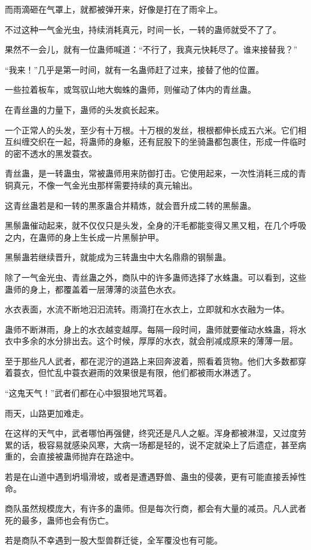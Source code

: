 \begin{this_body}
而雨滴砸在气罩上，就都被弹开来，好像是打在了雨伞上。

不过这种一气金光虫，持续消耗真元，时间一长，一转的蛊师就受不了了。

果然不一会儿，就有一位蛊师喊道：“不行了，我真元快耗尽了。谁来接替我？”

“我来！”几乎是第一时间，就有一名蛊师赶了过来，接替了他的位置。

一些拉着板车，或驾驭山地大蜘蛛的蛊师，则催动了体内的青丝蛊。

在青丝蛊的力量下，蛊师的头发疯长起来。

一个正常人的头发，至少有十万根。十万根的发丝，根根都伸长成五六米。它们相互纠缠交织在一起，将蛊师的身躯，还有屁股下的坐骑蛊都包裹住，形成一件临时的密不透水的黑发蓑衣。

青丝蛊，是一转蛊虫，常被蛊师用来防御打击。它使用起来，一次性消耗三成的青铜真元，不像一气金光虫那样需要持续的真元输出。

这青丝蛊若是和一转的黒豕蛊合并精炼，就会晋升成二转的黑鬃蛊。

黑鬃蛊催动起来，就不仅仅只是头发，全身的汗毛都能变得又黑又粗，在几个呼吸之内，在蛊师的身上生长成一片黑鬃护甲。

黑鬃蛊若继续晋升，就能成为三转蛊虫中大名鼎鼎的钢鬃蛊。

除了一气金光虫、青丝蛊之外，商队中的许多蛊师选择了水蛛蛊。可以看到，这些蛊师的身上，都覆盖着一层薄薄的淡蓝色水衣。

水衣表面，水流不断地汩汩流转。雨滴打在水衣上，立即就和水衣融为一体。

蛊师不断淋雨，身上的水衣越变越厚。每隔一段时间，蛊师就要催动水蛛蛊，将水衣中多余的水分排出去。这个时候，厚厚的水衣，就会削减成原来的薄薄一层。

至于那些凡人武者，都在泥泞的道路上来回奔波着，照看着货物。他们大多数都穿着蓑衣，但忙乱中蓑衣避雨的效果很是有限，他们都被雨水淋透了。

“这鬼天气！”武者们都在心中狠狠地咒骂着。

雨天，山路更加难走。

在这样的天气中，武者哪怕再强健，终究还是凡人之躯。浑身都被淋湿，又过度劳累的话，极容易就感染风寒，大病一场都是轻的，说不定就染上了后遗症，甚至病重的，会直接被蛊师抛弃在路途中。

若是在山道中遇到坍塌滑坡，或者是遭遇野兽、蛊虫的侵袭，更有可能直接丢掉性命。

商队虽然规模庞大，有许多的蛊师。但是每次行商，都会有大量的减员。凡人武者死的最多，蛊师也会有伤亡。

若是商队不幸遇到一股大型兽群迁徙，全军覆没也有可能。


\end{this_body}
